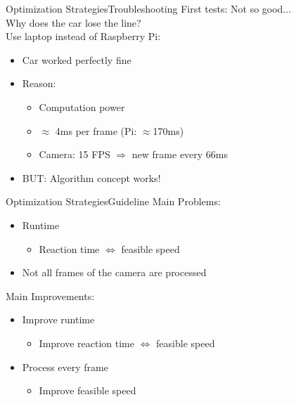 

\begin{frame}[plain]{Optimization Strategies}{Troubleshooting}
\large
\pause
	First tests: Not so good...\\
	\pause
	Why does the car lose the line?\\
	\pause
	Use laptop instead of Raspberry Pi: 
		\pause
		\begin{itemize}
			\large
			\item Car worked perfectly fine
			\pause
			\item Reason: 
			\pause
			\begin{itemize}
				\large
				\item Computation power
				\pause
				\item $\approx$ 4ms per frame \pause (Pi: $\approx$170ms)
				\pause
				\item Camera: 15 FPS \pause $\Rightarrow$ new frame every 66ms
			\end{itemize}	
			\pause
			\item BUT: Algorithm concept works!
			
		\end{itemize}		 
\end{frame}
 
  
\begin{frame}[plain]{Optimization Strategies}{Guideline}
\large
	Main Problems:
	\pause
	\begin{itemize}
	\large
		\item Runtime
		\begin{itemize}
		\large
			\item Reaction time $\Leftrightarrow$ feasible speed
		\end{itemize}
		\pause
		\item Not all frames of the camera are processed
	\end{itemize}
	\pause
	\vspace{1.5cm}
	Main Improvements:
	\pause
	\begin{itemize}
	\large
		\item Improve runtime
		\begin{itemize}
		\large
			\item Improve reaction time $\Leftrightarrow$ feasible speed
		\end{itemize}
		\pause
		\item Process every frame
		\begin{itemize}
		\large
			\item Improve feasible speed
		\end{itemize}
	\end{itemize}
	
\end{frame}


